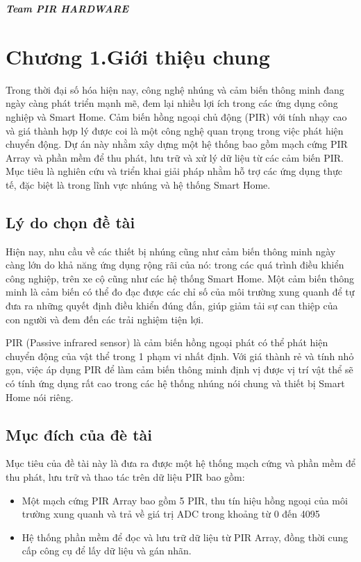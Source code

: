 \documentclass{article}
\begin{document}
\hspace*{\fill}\textit{\textbf{\fontsize{14pt}{0pt}\selectfont Team PIR HARDWARE}}

\cleardoublepage
{}
\tableofcontents %
\thispagestyle{empty}

\cleardoublepage
\section*{Chương 1.Giới thiệu chung}
\setcounter{section}{1}
Trong thời đại số hóa hiện nay, công nghệ nhúng và cảm biến thông minh đang ngày càng phát triển mạnh mẽ, đem lại nhiều lợi ích trong các ứng dụng công nghiệp và Smart Home. Cảm biến hồng ngoại chủ động (PIR) với tính nhạy cao và giá thành hợp lý được coi là một công nghệ quan trọng trong việc phát hiện chuyển động. Dự án này nhằm xây dựng một hệ thống bao gồm mạch cứng PIR Array và phần mềm để thu phát, lưu trữ và xử lý dữ liệu từ các cảm biến PIR. Mục tiêu là nghiên cứu và triển khai giải pháp nhằm hỗ trợ các ứng dụng thực tế, đặc biệt là trong lĩnh vực nhúng và hệ thống Smart Home.
\subsection{Lý do chọn đề tài }
Hiện nay, nhu cầu về các thiết bị nhúng cũng như cảm biến thông minh ngày càng lớn do khả năng ứng dụng rộng rãi của nó: trong các quá trình điều khiển công nghiệp, trên xe cộ cũng như các hệ thống Smart Home. Một cảm biến thông minh là cảm biến có thể đo đạc được các chỉ số của môi trường xung quanh để tự đưa ra những quyết định điều khiển đúng đắn, giúp giảm tải sự can thiệp của con người và đem đến các trải nghiệm tiện lợi. 

PIR (Passive infrared sensor) là cảm biến hồng ngoại phát có thể phát hiện chuyển động của vật thể trong 1 phạm vi nhất định. Với giá thành rẻ và tính nhỏ gọn, việc áp dụng PIR để làm cảm biến thông minh định vị được vị trí vật thể sẽ có tính ứng dụng rất cao trong các hệ thống nhúng nói chung và thiết bị Smart Home nói riêng. 
\subsection{Mục đích của đè tài}
Mục tiêu của đề tài này là đưa ra được một hệ thống mạch cứng và phần mềm để thu phát, lưu trữ và thao tác trên dữ liệu PIR bao gồm: 
\begin{itemize}
    \item Một mạch cứng PIR Array bao gồm 5 PIR, thu tín hiệu hồng ngoại của môi trường xung quanh và trả về giá trị ADC trong khoảng từ 0 đến 4095
    \item Hệ thống phần mềm để đọc và lưu trữ dữ liệu từ PIR Array, đồng thời cung cấp công cụ để lấy dữ liệu và gán nhãn. 
\end{itemize}
\end{document}
